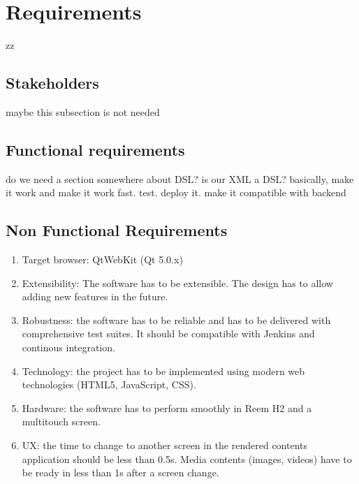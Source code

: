 \chapter{Requirements}
zz
\section{Stakeholders}
maybe this subsection is not needed

\section{Functional requirements}
do we need a section somewhere about DSL? is our XML a DSL?
basically, make it work and make it work fast. test. deploy it. make it compatible with backend

\section{Non Functional Requirements}
\begin{enumerate}
    \item Target browser: QtWebKit (Qt 5.0.x)
    \item Extensibility: The software has to be extensible. The design has to allow adding new features in the future.
    \item Robustness: the software has to be reliable and has to be delivered with comprehensive test suites. It should be compatible with Jenkins and continous integration.
    \item Technology: the project has to be implemented using modern web technologies (HTML5, JavaScript, CSS).
    \item Hardware: the software has to perform smoothly in Reem H2 and a multitouch screen.
    \item UX: the time to change to another screen in the rendered contents application should be less than 0.5s. Media contents (images, videos) have to be ready in less than 1s after a screen change.
\end{enumerate}
